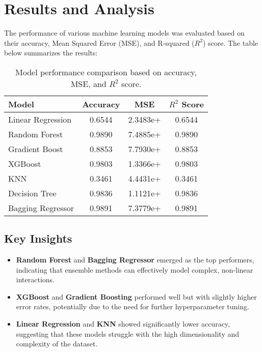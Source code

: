\documentclass[10pt,twocolumn,letterpaper]{article}
\begin{document}
\section{Results and Analysis}
The performance of various machine learning models was evaluated based on their accuracy, Mean Squared Error (MSE), and R-squared (\(R^2\)) score. The table below summarizes the results:

\begin{table}[H]
    \centering
    \begin{tabular}{|p{3cm}|c|c|c|} %
    \hline
    \textbf{Model}            & \textbf{Accuracy} & \textbf{MSE}        & \textbf{\(R^2\) Score} \\ \hline
    Linear Regression         & 0.6544            & 2.3483e+          & 0.6544                \\ \hline
    Random Forest             & 0.9890            & 7.4885e+          & 0.9890                \\ \hline
    Gradient Boost            & 0.8853            & 7.7930e+          & 0.8853                \\ \hline
    XGBoost                   & 0.9803            & 1.3366e+          & 0.9803                \\ \hline
    KNN                       & 0.3461            & 4.4431e+          & 0.3461                \\ \hline
    Decision Tree             & 0.9836            & 1.1121e+          & 0.9836                \\ \hline
    Bagging Regressor         & 0.9891            & 7.3779e+          & 0.9891                \\ \hline
    \end{tabular}
    \caption{Model performance comparison based on accuracy, MSE, and \(R^2\) score.}
    \label{tab:results}
\end{table}




\subsection{Key Insights}
\begin{itemize}[itemsep=-0.5em] %
    \item \textbf{Random Forest} and \textbf{Bagging Regressor} emerged as the top performers, indicating that ensemble methods can effectively model complex, non-linear interactions.
    \item \textbf{XGBoost} and \textbf{Gradient Boosting} performed well but with slightly higher error rates, potentially due to the need for further hyperparameter tuning.
    \item \textbf{Linear Regression} and \textbf{KNN} showed significantly lower accuracy, suggesting that these models struggle with the high dimensionality and complexity of the dataset.
\end{itemize}
\end{document}

